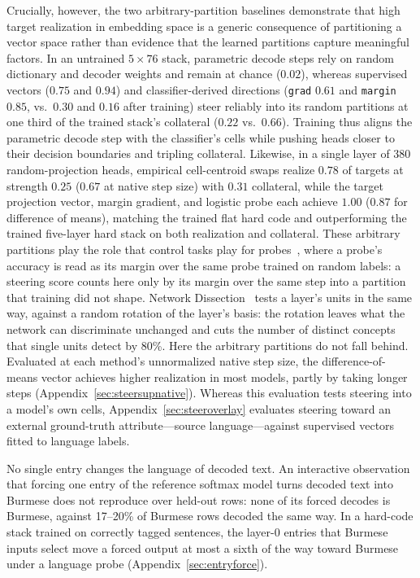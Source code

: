 Crucially, however, the two arbitrary-partition baselines demonstrate that
high target realization in embedding space is a generic consequence of
partitioning a vector space rather than evidence that the learned
partitions capture meaningful factors. In an untrained $5\times76$ stack,
parametric decode steps rely on random dictionary and decoder weights and
remain at chance ($0.02$), whereas supervised vectors ($0.75$ and $0.94$)
and classifier-derived directions (\texttt{grad} $0.61$ and \texttt{margin}
$0.85$, vs.\ $0.30$ and $0.16$ after training) steer reliably into its
random partitions at one third of the trained stack's collateral ($0.22$
vs.\ $0.66$). Training thus aligns the parametric decode step with the
classifier's cells while pushing heads closer to their decision boundaries
and tripling collateral. Likewise, in a single layer of 380
random-projection heads, empirical cell-centroid swaps realize $0.78$ of
targets at strength $0.25$ ($0.67$ at native step size) with $0.31$
collateral, while the target projection vector, margin gradient, and
logistic probe each achieve $1.00$ ($0.87$ for difference of means),
matching the trained flat hard code and outperforming the trained five-layer
hard stack on both realization and collateral. These arbitrary partitions
play the role that control tasks play for probes~\cite{hewitt2019}, where
a probe's accuracy is read as its margin over the same probe trained on
random labels: a steering score counts here only by its margin over the
same step into a partition that training did not shape. Network
Dissection~\cite[Sec.~3.2]{bau2017} tests a layer's units in the same way,
against a random rotation of the layer's basis: the rotation leaves what the
network can discriminate unchanged and cuts the number of distinct concepts
that single units detect by 80\%. Here the arbitrary partitions do not fall
behind. Evaluated at each method's
unnormalized native step size, the difference-of-means vector achieves
higher realization in most models, partly by taking longer steps
(Appendix~\ref{sec:steersupnative}). Whereas this evaluation tests steering
into a model's own cells, Appendix~\ref{sec:steeroverlay} evaluates
steering toward an external ground-truth attribute---source
language---against supervised vectors fitted to language labels.

No single entry changes the language of decoded text. An interactive
observation that forcing one entry of the reference softmax model turns
decoded text into Burmese does not reproduce over held-out rows: none of its
forced decodes is Burmese, against 17--20\% of Burmese rows decoded the same
way. In a hard-code stack trained on correctly tagged sentences, the
layer-0 entries that Burmese inputs select move a forced output at most a
sixth of the way toward Burmese under a language probe
(Appendix~\ref{sec:entryforce}).


